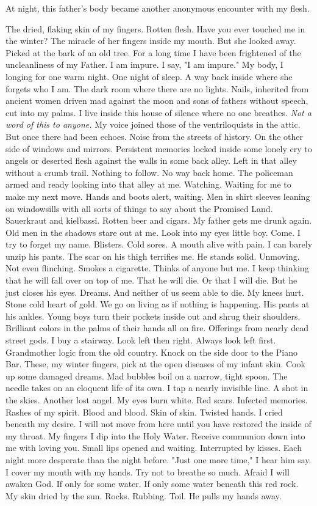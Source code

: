 \documentclass[
]{memoir}
\begin{document}
At night, this father's body became another anonymous encounter with my
flesh.

The dried, flaking skin of my fingers. Rotten flesh. Have you ever
touched me in the winter? The miracle of her fingers inside my mouth.
But she looked away. Picked at the bark of an old tree. For a long time
I have been frightened of the uncleanliness of my Father. I am impure. I
say, "I am impure." My body, I longing for one warm night. One night of
sleep. A way back inside where she forgets who I am. The dark room where
there are no lights. Nails, inherited from ancient women driven mad
against the moon and sons of fathers without speech, cut into my palms.
I live inside this house of silence where no one breathes. \emph{Not a
word of this to anyone.} My voice joined those of the ventriloquists in
the attic. But once there had been echoes. Noise from the streets of
history. On the other side of windows and mirrors. Persistent memories
locked inside some lonely cry to angels or deserted flesh against the
walls in some back alley. Left in that alley without a crumb trail.
Nothing to follow. No way back home. The policeman armed and ready
looking into that alley at me. Watching. Waiting for me to make my next
move. Hands and boots alert, waiting. Men in shirt sleeves leaning on
windowsills with all sorts of things to say about the Promised Land.
Sauerkraut and kielbassi. Rotten beer and cigars. My father gets me
drunk again. Old men in the shadows stare out at me. Look into my eyes
little boy. Come. I try to forget my name. Blisters. Cold sores. A mouth
alive with pain. I can barely unzip his pants. The scar on his thigh
terrifies me. He stands solid. Unmoving. Not even flinching. Smokes a
cigarette. Thinks of anyone but me. I keep thinking that he will fall
over on top of me. That he will die. Or that I will die. But he just
closes his eyes. Dreams. And neither of us seem able to die. My knees
hurt. Stone cold heart of gold. We go on living as if nothing is
happening. His pants at his ankles. Young boys turn their pockets inside
out and shrug their shoulders. Brilliant colors in the palms of their
hands all on fire. Offerings from nearly dead street gods. I buy a
stairway. Look left then right. Always look left first. Grandmother
logic from the old country. Knock on the side door to the Piano Bar.
These, my winter fingers, pick at the open diseases of my infant skin.
Cook up some damaged dreams. Mad bubbles boil on a narrow, tight spoon.
The needle takes on an eloquent life of its own. I tap a nearly
invisible line. A shot in the skies. Another lost angel. My eyes burn
white. Red scars. Infected memories. Rashes of my spirit. Blood and
blood. Skin of skin. Twisted hands. I cried beneath my desire. I will
not move from here until you have restored the inside of my throat. My
fingers I dip into the Holy Water. Receive communion down into me with
loving you. Small lips opened and waiting. Interrupted by kisses. Each
night more desperate than the night before. "Just one more time," I hear
him say. I cover my mouth with my hands. Try not to breathe so much.
Afraid I will awaken God. If only for some water. If only some water
beneath this red rock. My skin dried by the sun. Rocks. Rubbing. Toil.
He pulls my hands away.
\end{document}
